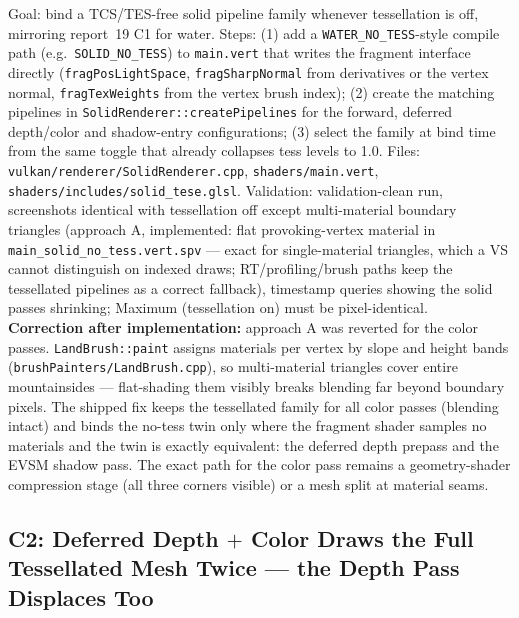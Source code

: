 \documentclass[11pt,a4paper]{article}
\begin{document}
\begin{tcolorbox}[promptbox={Prompt --- C1: non-tessellation solid pipeline family}]
Goal: bind a TCS/TES-free solid pipeline family whenever tessellation is off,
mirroring report~19 C1 for water. Steps: (1) add a \texttt{WATER\_NO\_TESS}-style
compile path (e.g.\ \texttt{SOLID\_NO\_TESS}) to \texttt{main.vert} that writes
the fragment interface directly (\texttt{fragPosLightSpace},
\texttt{fragSharpNormal} from derivatives or the vertex normal,
\texttt{fragTexWeights} from the vertex brush index); (2) create the matching
pipelines in \texttt{SolidRenderer::createPipelines} for the forward, deferred
depth/color and shadow-entry configurations; (3) select the family at bind time
from the same toggle that already collapses tess levels to 1.0. Files:
\texttt{vulkan/renderer/SolidRenderer.cpp}, \texttt{shaders/main.vert},
\texttt{shaders/includes/solid\_tese.glsl}. Validation: validation-clean run,
screenshots identical with tessellation off except multi-material boundary
triangles (approach A, implemented: flat provoking-vertex material in
\texttt{main\_solid\_no\_tess.vert.spv} --- exact for single-material
triangles, which a VS cannot distinguish on indexed draws; RT/profiling/brush
paths keep the tessellated pipelines as a correct fallback), timestamp queries
showing the solid passes shrinking; Maximum (tessellation on) must be
pixel-identical.
\\ \textbf{Correction after implementation:} approach A was reverted for the
color passes. \texttt{LandBrush::paint} assigns materials per vertex by slope
and height bands (\texttt{brushPainters/LandBrush.cpp}), so multi-material triangles
cover entire mountainsides --- flat-shading them visibly breaks blending far
beyond boundary pixels. The shipped fix keeps the tessellated family for all
color passes (blending intact) and binds the no-tess twin only where the
fragment shader samples no materials and the twin is exactly equivalent: the
deferred depth prepass and the EVSM shadow pass. The exact path for the color
pass remains a geometry-shader compression stage (all three corners visible)
or a mesh split at material seams.
\end{tcolorbox}

\subsection{C2: Deferred Depth $+$ Color Draws the Full Tessellated Mesh Twice --- the Depth Pass Displaces Too}
\label{sec:c2}
\end{document}
